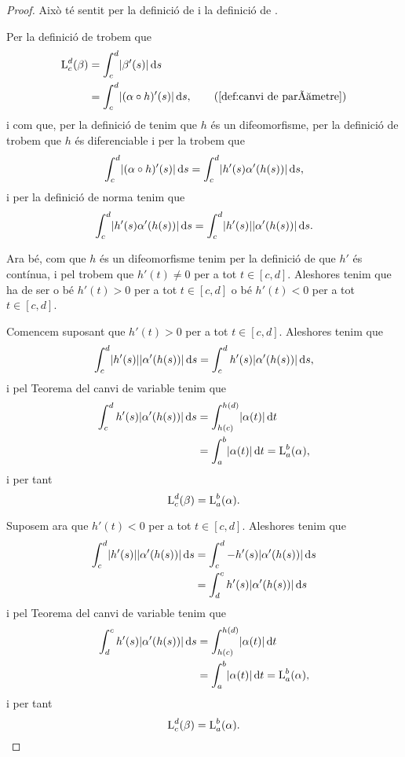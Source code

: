\documentclass[../Apunts.tex]{subfiles}
\begin{document}
	\begin{proof}
		Això té sentit per la definició de  i la definició de .
		
		Per la definició de  trobem que
		\begin{align*}
			\Long_{c}^{d}(\beta)&=\int_{c}^{d}\norm{\beta'(s)}\diff s \\
			&=\int_{c}^{d}\norm{(\alpha\circ h)'(s)}\diff s, \tag{\ref{def:canvi de paràmetre}}
		\end{align*}
		i com que, per la definició de  tenim que \(h\) és un difeomorfisme, per la definició de  trobem que \(h\) és diferenciable i per la  trobem que
		\[\int_{c}^{d}\norm{(\alpha\circ h)'(s)}\diff s=\int_{c}^{d}\norm{h'(s)\alpha'(h(s))}\diff s,\]
		i per la definició de norma tenim que%
		\[\int_{c}^{d}\norm{h'(s)\alpha'(h(s))}\diff s=\int_{c}^{d}\abs{h'(s)}\norm{\alpha'(h(s))}\diff s.\]
		
		Ara bé, com que \(h\) és un difeomorfisme tenim per la definició de  que \(h'\) és contínua, i pel \corollari{}  trobem que \(h'(t)\neq0\) per a tot \(t\in[c,d]\). Aleshores tenim que ha de ser o bé \(h'(t)>0\) per a tot \(t\in[c,d]\) o bé \(h'(t)<0\) per a tot \(t\in[c,d]\).
		
		Comencem suposant que \(h'(t)>0\) per a tot \(t\in[c,d]\). Aleshores tenim que
		\[\int_{c}^{d}\abs{h'(s)}\norm{\alpha'(h(s))}\diff s=\int_{c}^{d}h'(s)\norm{\alpha'(h(s))}\diff s,\]
		i pel Teorema del canvi de variable tenim que %
		\begin{align*}
			\int_{c}^{d}h'(s)\norm{\alpha'(h(s))}\diff s&=\int_{h(c)}^{h(d)}\norm{\alpha(t)}\diff t \\
			&=\int_{a}^{b}\norm{\alpha(t)}\diff t=\Long_{a}^{b}(\alpha),
		\end{align*}
		i per tant
		\[\operatorname{L}_{c}^{d}(\beta)=\operatorname{L}_{a}^{b}(\alpha).\]
		
		Suposem ara que \(h'(t)<0\) per a tot \(t\in[c,d]\). Aleshores tenim que			\begin{align*}
			\int_{c}^{d}\abs{h'(s)}\norm{\alpha'(h(s))}\diff s&=\int_{c}^{d}-h'(s)\norm{\alpha'(h(s))}\diff s \\
			&=\int_{d}^{c}h'(s)\norm{\alpha'(h(s))}\diff s
		\end{align*}
		i pel Teorema del canvi de variable tenim que %
		\begin{align*}
			\int_{d}^{c}h'(s)\norm{\alpha'(h(s))}\diff s&=\int_{h(c)}^{h(d)}\norm{\alpha(t)}\diff t \\
			&=\int_{a}^{b}\norm{\alpha(t)}\diff t=\Long_{a}^{b}(\alpha),
		\end{align*}
		i per tant
		\[\operatorname{L}_{c}^{d}(\beta)=\operatorname{L}_{a}^{b}(\alpha).\qedhere\]
	\end{proof}
\end{document}
